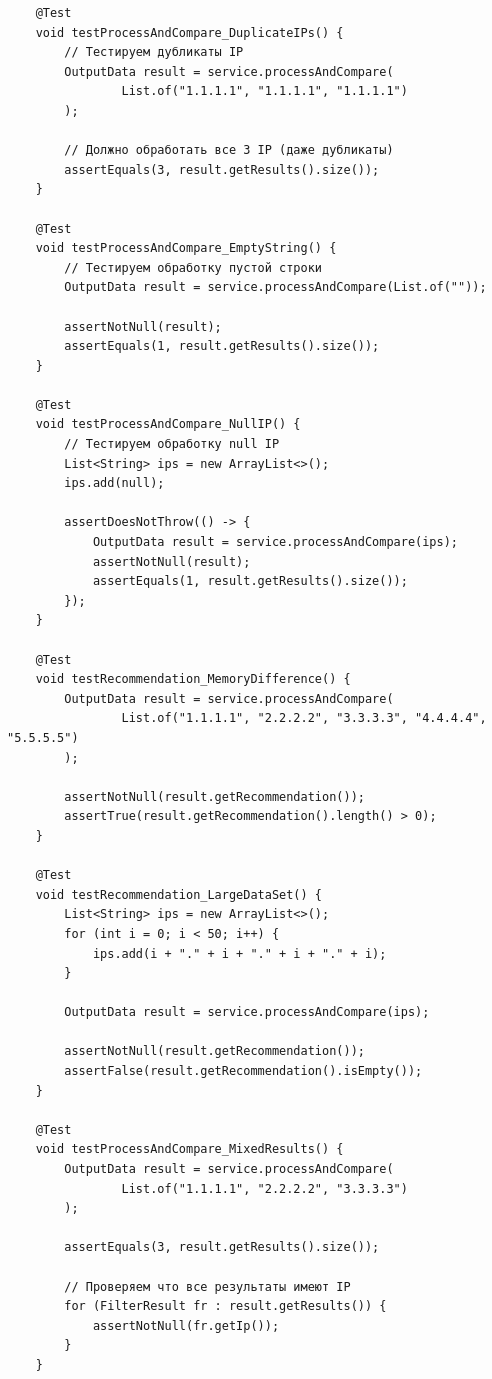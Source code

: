 \begin{verbatim}
    @Test
    void testProcessAndCompare_DuplicateIPs() {
        // Тестируем дубликаты IP
        OutputData result = service.processAndCompare(
                List.of("1.1.1.1", "1.1.1.1", "1.1.1.1")
        );

        // Должно обработать все 3 IP (даже дубликаты)
        assertEquals(3, result.getResults().size());
    }

    @Test
    void testProcessAndCompare_EmptyString() {
        // Тестируем обработку пустой строки
        OutputData result = service.processAndCompare(List.of(""));

        assertNotNull(result);
        assertEquals(1, result.getResults().size());
    }

    @Test
    void testProcessAndCompare_NullIP() {
        // Тестируем обработку null IP
        List<String> ips = new ArrayList<>();
        ips.add(null);

        assertDoesNotThrow(() -> {
            OutputData result = service.processAndCompare(ips);
            assertNotNull(result);
            assertEquals(1, result.getResults().size());
        });
    }

    @Test
    void testRecommendation_MemoryDifference() {
        OutputData result = service.processAndCompare(
                List.of("1.1.1.1", "2.2.2.2", "3.3.3.3", "4.4.4.4", "5.5.5.5")
        );

        assertNotNull(result.getRecommendation());
        assertTrue(result.getRecommendation().length() > 0);
    }

    @Test
    void testRecommendation_LargeDataSet() {
        List<String> ips = new ArrayList<>();
        for (int i = 0; i < 50; i++) {
            ips.add(i + "." + i + "." + i + "." + i);
        }

        OutputData result = service.processAndCompare(ips);

        assertNotNull(result.getRecommendation());
        assertFalse(result.getRecommendation().isEmpty());
    }

    @Test
    void testProcessAndCompare_MixedResults() {
        OutputData result = service.processAndCompare(
                List.of("1.1.1.1", "2.2.2.2", "3.3.3.3")
        );

        assertEquals(3, result.getResults().size());

        // Проверяем что все результаты имеют IP
        for (FilterResult fr : result.getResults()) {
            assertNotNull(fr.getIp());
        }
    }


\end{verbatim}
